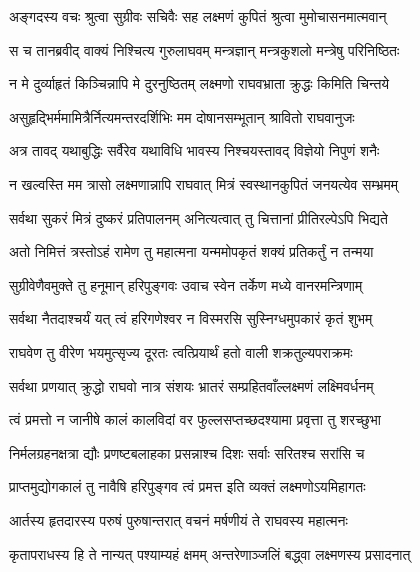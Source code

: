
\twolineshloka
{अङ्गदस्य वचः श्रुत्वा सुग्रीवः सचिवैः सह}
{लक्ष्मणं कुपितं श्रुत्वा मुमोचासनमात्मवान्} %

\twolineshloka
{स च तानब्रवीद् वाक्यं निश्चित्य गुरुलाघवम्}
{मन्त्रज्ञान् मन्त्रकुशलो मन्त्रेषु परिनिष्ठितः} %

\twolineshloka
{न मे दुर्व्याहृतं किञ्चिन्नापि मे दुरनुष्ठितम्}
{लक्ष्मणो राघवभ्राता क्रुद्धः किमिति चिन्तये} %

\twolineshloka
{असुहृद्भिर्ममामित्रैर्नित्यमन्तरदर्शिभिः}
{मम दोषानसम्भूतान् श्रावितो राघवानुजः} %

\twolineshloka
{अत्र तावद् यथाबुद्धिः सर्वैरेव यथाविधि}
{भावस्य निश्चयस्तावद् विज्ञेयो निपुणं शनैः} %

\twolineshloka
{न खल्वस्ति मम त्रासो लक्ष्मणान्नापि राघवात्}
{मित्रं स्वस्थानकुपितं जनयत्येव सम्भ्रमम्} %

\twolineshloka
{सर्वथा सुकरं मित्रं दुष्करं प्रतिपालनम्}
{अनित्यत्वात् तु चित्तानां प्रीतिरल्पेऽपि भिद्यते} %

\twolineshloka
{अतो निमित्तं त्रस्तोऽहं रामेण तु महात्मना}
{यन्ममोपकृतं शक्यं प्रतिकर्तुं न तन्मया} %

\twolineshloka
{सुग्रीवेणैवमुक्ते तु हनूमान् हरिपुङ्गवः}
{उवाच स्वेन तर्केण मध्ये वानरमन्त्रिणाम्} %

\twolineshloka
{सर्वथा नैतदाश्चर्यं यत् त्वं हरिगणेश्वर}
{न विस्मरसि सुस्निग्धमुपकारं कृतं शुभम्} %

\twolineshloka
{राघवेण तु वीरेण भयमुत्सृज्य दूरतः}
{त्वत्प्रियार्थं हतो वाली शक्रतुल्यपराक्रमः} %

\twolineshloka
{सर्वथा प्रणयात् क्रुद्धो राघवो नात्र संशयः}
{भ्रातरं सम्प्रहितवाँल्लक्ष्मणं लक्ष्मिवर्धनम्} %

\twolineshloka
{त्वं प्रमत्तो न जानीषे कालं कालविदां वर}
{फुल्लसप्तच्छदश्यामा प्रवृत्ता तु शरच्छुभा} %

\twolineshloka
{निर्मलग्रहनक्षत्रा द्यौः प्रणष्टबलाहका}
{प्रसन्नाश्च दिशः सर्वाः सरितश्च सरांसि च} %

\twolineshloka
{प्राप्तमुद्योगकालं तु नावैषि हरिपुङ्गव}
{त्वं प्रमत्त इति व्यक्तं लक्ष्मणोऽयमिहागतः} %

\twolineshloka
{आर्तस्य हृतदारस्य परुषं पुरुषान्तरात्}
{वचनं मर्षणीयं ते राघवस्य महात्मनः} %

\twolineshloka
{कृतापराधस्य हि ते नान्यत् पश्याम्यहं क्षमम्}
{अन्तरेणाञ्जलिं बद्ध्वा लक्ष्मणस्य प्रसादनात्} %

